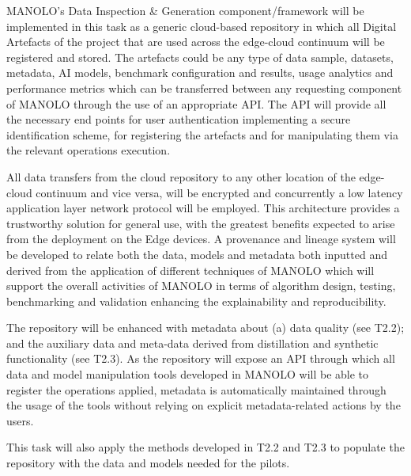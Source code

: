 

MANOLO's Data Inspection \& Generation component/framework will be
implemented in this task as a generic cloud-based repository in which
all Digital Artefacts of the project that are used across the
edge-cloud continuum will be registered and stored. The artefacts
could be any type of data sample, datasets, metadata, AI models,
benchmark configuration and results, usage analytics and performance
metrics which can be transferred between any requesting component of
MANOLO through the use of an appropriate API. The API will provide all
the necessary end points for user authentication implementing a secure
identification scheme, for registering the artefacts and for
manipulating them via the relevant operations execution.

All data
transfers from the cloud repository to any other location of the
edge-cloud continuum and vice versa, will be encrypted and
concurrently a low latency application layer network protocol will be
employed. This architecture provides a trustworthy solution for
general use, with the greatest benefits expected to arise from the
deployment on the Edge devices. A provenance and lineage system will
be developed to relate both the data, models and metadata both
inputted and derived from the application of different techniques of
MANOLO which will support the overall activities of MANOLO in terms of
algorithm design, testing, benchmarking and validation enhancing the
explainability and reproducibility.

The repository will be enhanced
with metadata about (a) data quality (see T2.2); and the auxiliary
data and meta-data derived from distillation and synthetic
functionality (see T2.3). As the repository will expose an API through
which all data and model manipulation tools developed in MANOLO will
be able to register the operations applied, metadata is automatically
maintained through the usage of the tools without relying on explicit
metadata-related actions by the users.

This task will also apply the
methods developed in T2.2 and T2.3 to populate the repository with the
data and models needed for the pilots.
